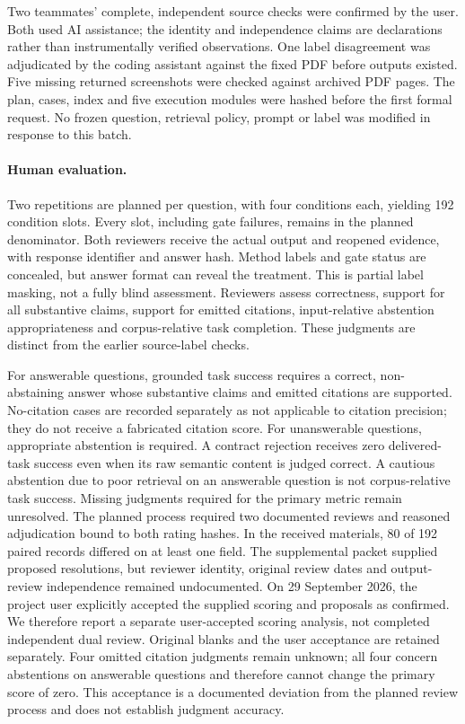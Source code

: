 \documentclass{article}
\begin{document}
Two teammates' complete, independent source checks were confirmed by the user. Both used AI assistance; the identity and independence claims are declarations rather than instrumentally verified observations. One label disagreement was adjudicated by the coding assistant against the fixed PDF before outputs existed. Five missing returned screenshots were checked against archived PDF pages. The plan, cases, index and five execution modules were hashed before the first formal request. No frozen question, retrieval policy, prompt or label was modified in response to this batch.

\paragraph{Human evaluation.}
Two repetitions are planned per question, with four conditions each, yielding 192 condition slots. Every slot, including gate failures, remains in the planned denominator. Both reviewers receive the actual output and reopened evidence, with response identifier and answer hash. Method labels and gate status are concealed, but answer format can reveal the treatment. This is partial label masking, not a fully blind assessment. Reviewers assess correctness, support for all substantive claims, support for emitted citations, input-relative abstention appropriateness and corpus-relative task completion. These judgments are distinct from the earlier source-label checks.

For answerable questions, grounded task success requires a correct, non-abstaining answer whose substantive claims and emitted citations are supported. No-citation cases are recorded separately as not applicable to citation precision; they do not receive a fabricated citation score. For unanswerable questions, appropriate abstention is required. A contract rejection receives zero delivered-task success even when its raw semantic content is judged correct. A cautious abstention due to poor retrieval on an answerable question is not corpus-relative task success. Missing judgments required for the primary metric remain unresolved. The planned process required two documented reviews and reasoned adjudication bound to both rating hashes. In the received materials, 80 of 192 paired records differed on at least one field. The supplemental packet supplied proposed resolutions, but reviewer identity, original review dates and output-review independence remained undocumented. On 29 September 2026, the project user explicitly accepted the supplied scoring and proposals as confirmed. We therefore report a separate user-accepted scoring analysis, not completed independent dual review. Original blanks and the user acceptance are retained separately. Four omitted citation judgments remain unknown; all four concern abstentions on answerable questions and therefore cannot change the primary score of zero. This acceptance is a documented deviation from the planned review process and does not establish judgment accuracy.
\end{document}

